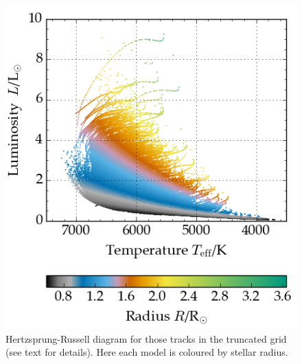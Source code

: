 \begin{figure}
    \centering
    \includegraphics[width=0.6\linewidth]{HRD6.png}
    \caption[Hertzsprung-Russell diagram for the grid of models]{Hertzsprung-Russell diagram for those tracks in the truncated grid (see text for details). Here each model is coloured by stellar radius.}
    \label{fig:HRDRad}
\end{figure}



